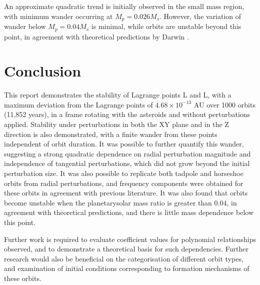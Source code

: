 \documentclass[11pt, a4paper,twocolumn]{article} %
\begin{document}
An approximate quadratic trend is initially observed in the small mass region, with minimum wander occurring at $ M_{p} = 0.026 M_{s}$. However, the variation of wander below $ M_{p} = 0.04 M_{s}$ is minimal, while orbits are unstable beyond this point, in agreement with theoretical predictions by Darwin \cite{Darwin1897}.

\section{Conclusion}
This report demonstrates the stability of Lagrange points L and L, with a maximum deviation from the Lagrange points of $4.68 \times 10^{-13}$ AU over 1000 orbits (11,852 years), in a frame rotating with the asteroids and without perturbations applied. Stability under perturbations in both the XY plane and in the Z direction is also demonstrated, with a finite wander from these points independent of orbit duration. It was possible to further quantify this wander, suggesting a strong quadratic dependence on radial perturbation magnitude and independence of tangential perturbations, which did not grow beyond the initial perturbation size.
It was also possible to replicate both tadpole and horseshoe orbits from radial perturbations, and frequency components were obtained for these orbits in agreement with previous literature. It was also found that orbits become unstable when the planetary\textendash solar mass ratio is greater than 0.04, in agreement with theoretical predictions, and there is little mass dependence below this point.

Further work is required to evaluate coefficient values for polynomial relationships observed, and to demonstrate a theoretical basis for such dependencies.
Further research would also be beneficial on the categorisation of different orbit types, and examination of initial conditions corresponding to formation mechanisms of these orbits. 



\clearpage
\printbibliography
\end{document}
